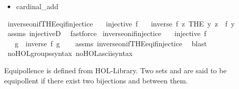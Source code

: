 \begin{isabellebody}
\begin{isamarkuptext}
\begin{itemize}
\item cardinal\_add%
\end{itemize}%
\end{isamarkuptext}\isamarkuptrue%
\isamarkupfalse%
\ inverse{\isacharunderscore}{\kern0pt}on{\isacharunderscore}{\kern0pt}if{\isacharunderscore}{\kern0pt}THE{\isacharunderscore}{\kern0pt}eq{\isacharunderscore}{\kern0pt}if{\isacharunderscore}{\kern0pt}injectice{\isacharcolon}{\kern0pt}\isanewline
\ \ \ {\isachardoublequoteopen}injective\ f{\isachardoublequoteclose}\isanewline
\ \ \ {\isachardoublequoteopen}inverse\ f\ {\isacharparenleft}{\kern0pt}{\isasymlambda}z{\isachardot}{\kern0pt}\ THE\ y{\isachardot}{\kern0pt}\ z\ {\isacharequal}{\kern0pt}\ f\ y{\isacharparenright}{\kern0pt}{\isachardoublequoteclose}\isanewline
%
\isadelimproof
\ \ %
\endisadelimproof
%
\isatagproof
{}\isamarkupfalse%
\ assms\ injectiveD\ \isamarkupfalse%
\ fastforce%
\endisatagproof
{\isafoldproof}%
%
\isadelimproof
\isanewline
%
\endisadelimproof
\isanewline
{}\isamarkupfalse%
\ inverse{\isacharunderscore}{\kern0pt}on{\isacharunderscore}{\kern0pt}if{\isacharunderscore}{\kern0pt}injectice{\isacharcolon}{\kern0pt}\isanewline
\ \ \ {\isachardoublequoteopen}injective\ f{\isachardoublequoteclose}\isanewline
\ \ \ g\ \ {\isachardoublequoteopen}inverse\ f\ g{\isachardoublequoteclose}\isanewline
%
\isadelimproof
\ \ %
\endisadelimproof
%
\isatagproof
{}\isamarkupfalse%
\ assms\ inverse{\isacharunderscore}{\kern0pt}on{\isacharunderscore}{\kern0pt}if{\isacharunderscore}{\kern0pt}THE{\isacharunderscore}{\kern0pt}eq{\isacharunderscore}{\kern0pt}if{\isacharunderscore}{\kern0pt}injectice\ \isamarkupfalse%
\ blast%
\endisatagproof
{\isafoldproof}%
%
\isadelimproof
\isanewline
%
\endisadelimproof
\isanewline
{}\isamarkupfalse%
\ no{\isacharunderscore}{\kern0pt}HOL{\isacharunderscore}{\kern0pt}groups{\isacharunderscore}{\kern0pt}syntax\ no{\isacharunderscore}{\kern0pt}HOL{\isacharunderscore}{\kern0pt}ascii{\isacharunderscore}{\kern0pt}syntax%
\isadelimdocument
%
\endisadelimdocument
%
\isatagdocument
%
\isamarkuptrue%
%
\endisatagdocument
{\isafolddocument}%
%
\isadelimdocument
%
\endisadelimdocument
%
\begin{isamarkuptext}%
Equipollence is defined from HOL-Library. 
Two sets  and  are said to be equipollent if there
exist two bijections  and  between them.%

\end{isamarkuptext}
\end{isabellebody}
